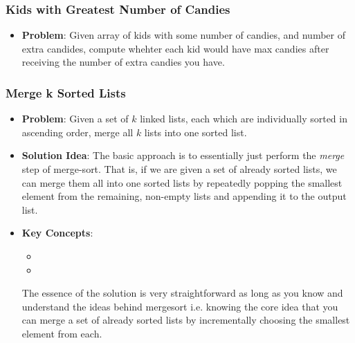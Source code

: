 \documentclass[10pt,a4paper]{article}
\begin{document}
\subsubsection*{Kids with Greatest Number of Candies}
\begin{itemize}
    \item \textbf{Problem}: Given array of kids with some number of candies, and number of extra candides, compute whehter each kid would have max candies after receiving the number of extra candies you have.
\end{itemize}

\subsubsection*{Merge k Sorted Lists}

\begin{itemize}
    \item \textbf{Problem}: Given a set of $k$ linked lists, each which are individually sorted in ascending order, merge all $k$ lists into one sorted list. 
    \item \textbf{Solution Idea}: The basic approach is to essentially just perform the \textit{merge} step of merge-sort. That is, if we are given a set of already sorted lists, we can merge them all into one sorted lists by repeatedly popping the smallest element from the remaining, non-empty lists and appending it to the output list.
    \item \textbf{Key Concepts}: 
    \begin{itemize}
        \item {}
        \item {}
    \end{itemize}
    The essence of the solution is very straightforward as long as you know and understand the ideas behind mergesort i.e. knowing the core idea that you can merge a set of already sorted lists by incrementally choosing the smallest element from each.
\end{itemize}
\end{document}
